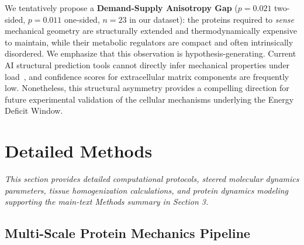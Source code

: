 We tentatively propose a \textbf{Demand-Supply Anisotropy Gap} ($p = 0.021$ two-sided, $p = 0.011$ one-sided, $n = 23$ in our dataset): the proteins required to \emph{sense} mechanical geometry are structurally extended and thermodynamically expensive to maintain, while their metabolic regulators are compact and often intrinsically disordered. We emphasize that this observation is hypothesis-generating. Current AI structural prediction tools cannot directly infer mechanical properties under load~\cite{gomes2022protein, zonta2024sequence}, and confidence scores for extracellular matrix components are frequently low. Nonetheless, this structural asymmetry provides a compelling direction for future experimental validation of the cellular mechanisms underlying the Energy Deficit Window.


\section{Detailed Methods}
\label{sec:supp_methods}

\textit{This section provides detailed computational protocols, steered molecular dynamics parameters, tissue homogenization calculations, and protein dynamics modeling supporting the main-text Methods summary in Section 3.}

\subsection{Multi-Scale Protein Mechanics Pipeline}

